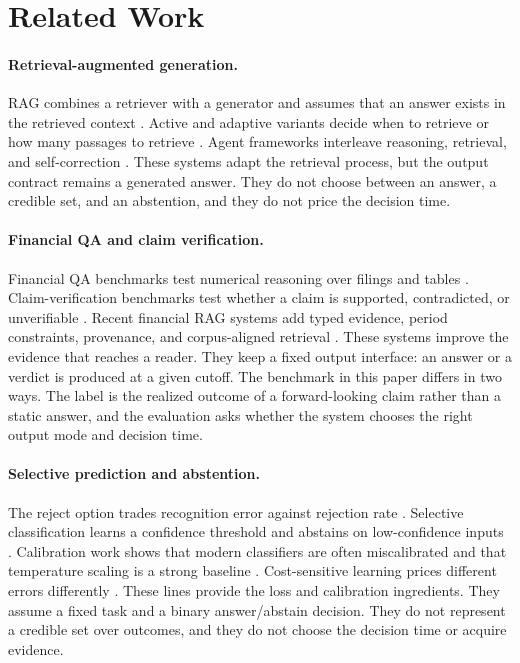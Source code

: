 \documentclass[11pt]{article}
\begin{document}
\section{Related Work}

\paragraph{Retrieval-augmented generation.}
RAG combines a retriever with a generator and assumes that an answer exists in the retrieved context \citep{lewis2020rag}. Active and adaptive variants decide when to retrieve or how many passages to retrieve \citep{jiang2023flare,jeong2024adaptiverag}. Agent frameworks interleave reasoning, retrieval, and self-correction \citep{yao2023react,shinn2023reflexion}. These systems adapt the retrieval process, but the output contract remains a generated answer. They do not choose between an answer, a credible set, and an abstention, and they do not price the decision time.

\paragraph{Financial QA and claim verification.}
Financial QA benchmarks test numerical reasoning over filings and tables \citep{chen2021finqa,zhu2021tatqa,islam2023financebench,liu2024finben}. Claim-verification benchmarks test whether a claim is supported, contradicted, or unverifiable \citep{zhao2024findver,rangapur2025finfact}. Recent financial RAG systems add typed evidence, period constraints, provenance, and corpus-aligned retrieval \citep{mansouri2026finrank,jiang2026finrate,chen2026hcrag,chi2026finsagent}. These systems improve the evidence that reaches a reader. They keep a fixed output interface: an answer or a verdict is produced at a given cutoff. The benchmark in this paper differs in two ways. The label is the realized outcome of a forward-looking claim rather than a static answer, and the evaluation asks whether the system chooses the right output mode and decision time.

\paragraph{Selective prediction and abstention.}
The reject option trades recognition error against rejection rate \citep{chow1970optimum}. Selective classification learns a confidence threshold and abstains on low-confidence inputs \citep{geifman2017selective}. Calibration work shows that modern classifiers are often miscalibrated and that temperature scaling is a strong baseline \citep{guo2017calibration}. Cost-sensitive learning prices different errors differently \citep{elkan2001cost}. These lines provide the loss and calibration ingredients. They assume a fixed task and a binary answer/abstain decision. They do not represent a credible set over outcomes, and they do not choose the decision time or acquire evidence.
\end{document}
